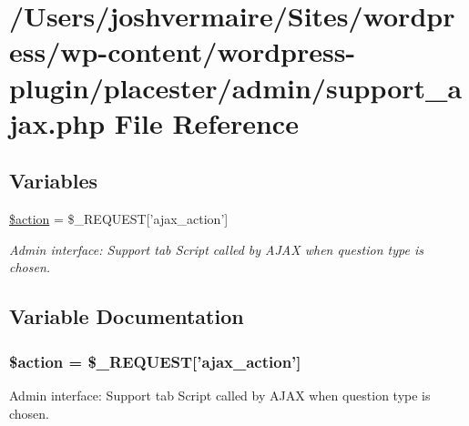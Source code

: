 \hypertarget{support__ajax_8php}{
\section{/Users/joshvermaire/Sites/wordpress/wp-\/content/wordpress-\/plugin/placester/admin/support\_\-ajax.php File Reference}
\label{d0/d73/support__ajax_8php}
}
\subsection*{Variables}
\begin{DoxyCompactItemize}
\item 
\hyperlink{support__ajax_8php_aa698a3e72116e8e778be0e95d908ee30}{\$action} = \$\_\-REQUEST\mbox{[}'ajax\_\-action'\mbox{]}
\begin{DoxyCompactList}\small\item\em Admin interface: Support tab Script called by AJAX when question type is chosen. \end{DoxyCompactList}\end{DoxyCompactItemize}


\subsection{Variable Documentation}
\hypertarget{support__ajax_8php_aa698a3e72116e8e778be0e95d908ee30}{
\subsubsection[{\$action}]{\setlength{\rightskip}{0pt plus 5cm}\$action = \$\_\-REQUEST\mbox{[}'ajax\_\-action'\mbox{]}}}
\label{d0/d73/support__ajax_8php_aa698a3e72116e8e778be0e95d908ee30}


Admin interface: Support tab Script called by AJAX when question type is chosen. 

